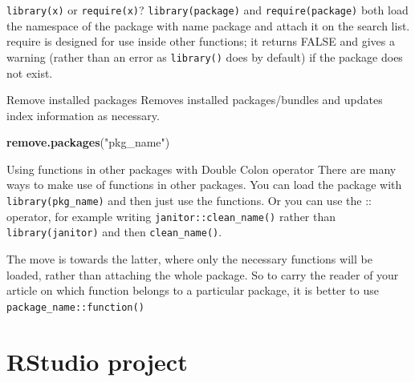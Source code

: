 \documentclass[
  ignorenonframetext,
]{beamer}
\newenvironment{Shaded}{\begin{snugshade}}{\end{snugshade}}
\newcommand{\KeywordTok}[1]{\textcolor[rgb]{0.13,0.29,0.53}{\textbf{#1}}}
\newcommand{\NormalTok}[1]{#1}
\newcommand{\StringTok}[1]{\textcolor[rgb]{0.31,0.60,0.02}{#1}}
\begin{document}
\begin{frame}[fragile]{\texttt{library(x)} or \texttt{require(x)}?}
\protect\hypertarget{libraryx-or-requirex}{}
\pause
\texttt{library(package)} and \texttt{require(package)} both load the
namespace of the package with name package and attach it on the search
list. require is designed for use inside other functions; it returns
FALSE and gives a warning (rather than an error as \texttt{library()}
does by default) if the package does not exist.

\end{frame}

\begin{frame}[fragile]{Remove installed packages}
\protect\hypertarget{remove-installed-packages}{}
\pause
Removes installed packages/bundles and updates index information as
necessary.

\begin{Shaded}
\begin{Highlighting}[]
\KeywordTok{remove.packages}\NormalTok{(}\StringTok{"pkg_name"}\NormalTok{)}
\end{Highlighting}
\end{Shaded}

\end{frame}

\begin{frame}[fragile]{Using functions in other packages with Double
Colon operator}
\protect\hypertarget{using-functions-in-other-packages-with-double-colon-operator}{}
\pause
There are many ways to make use of functions in other packages. You can
load the package with \texttt{library(pkg\_name)} and then just use the
functions. Or you can use the :: operator, for example writing
\texttt{janitor::clean\_name()} rather than \texttt{library(janitor)}
and then \texttt{clean\_name()}. \pause

The move is towards the latter, where only the necessary functions will
be loaded, rather than attaching the whole package. So to carry the
reader of your article on which function belongs to a particular
package, it is better to use \texttt{package\_name::function()}

\end{frame}
\section{RStudio project}
\end{document}

